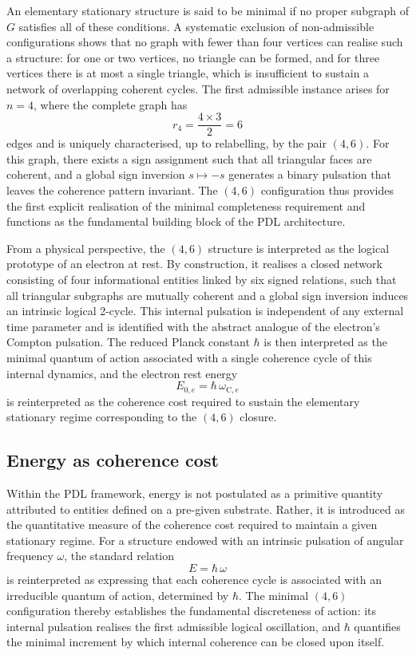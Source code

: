 \documentclass[12pt,a4paper]{article}
\begin{document}
An elementary stationary structure is said to be minimal if no proper subgraph of \(G\) satisfies all of these conditions.
A systematic exclusion of non-admissible configurations shows that no graph with fewer than four vertices can realise such a structure: for one or two vertices, no triangle can be formed, and for three vertices there is at most a single triangle, which is insufficient to sustain a network of overlapping coherent cycles.
The first admissible instance arises for \(n=4\), where the complete graph has
\[
  r_4 = \frac{4\times 3}{2} = 6
\]
edges and is uniquely characterised, up to relabelling, by the pair \((4,6)\).\cite{Laubscher2026IntroPDL,Laubscher2026PDL_English}
For this graph, there exists a sign assignment such that all triangular faces are coherent, and a global sign inversion \(s\mapsto -s\) generates a binary pulsation that leaves the coherence pattern invariant.
The \((4,6)\) configuration thus provides the first explicit realisation of the minimal completeness requirement and functions as the fundamental building block of the PDL architecture.

From a physical perspective, the \((4,6)\) structure is interpreted as the logical prototype of an electron at rest.\cite{Laubscher2026PDL_English,Laubscher2026LDP_French}
By construction, it realises a closed network consisting of four informational entities linked by six signed relations, such that all triangular subgraphs are mutually coherent and a global sign inversion induces an intrinsic logical 2-cycle.
This internal pulsation is independent of any external time parameter and is identified with the abstract analogue of the electron’s Compton pulsation.
The reduced Planck constant \(\hbar\) is then interpreted as the minimal quantum of action associated with a single coherence cycle of this internal dynamics, and the electron rest energy
\[
  E_{0,e} = \hbar\,\omega_{\text{C},e}
\]
is reinterpreted as the coherence cost required to sustain the elementary stationary regime corresponding to the \((4,6)\) closure.

\subsection{Energy as coherence cost}

Within the PDL framework, energy is not postulated as a primitive quantity attributed to entities defined on a pre-given substrate.
Rather, it is introduced as the quantitative measure of the coherence cost required to maintain a given stationary regime.\cite{Laubscher2026IntroPDL,Laubscher2026PDL_English}
For a structure endowed with an intrinsic pulsation of angular frequency \(\omega\), the standard relation
\[
  E = \hbar\,\omega
\]
is reinterpreted as expressing that each coherence cycle is associated with an irreducible quantum of action, determined by \(\hbar\).
The minimal \((4,6)\) configuration thereby establishes the fundamental discreteness of action: its internal pulsation realises the first admissible logical oscillation, and \(\hbar\) quantifies the minimal increment by which internal coherence can be closed upon itself.
\end{document}
